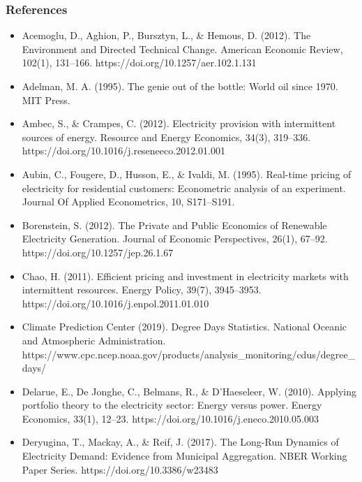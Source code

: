 \documentclass[aspectratio=169]{beamer}
\begin{document}
	
	
	\begin{frame}[allowframebreaks]
		\frametitle{References}
		\tiny 
		
		\begin{itemize}
			
			\item Acemoglu, D., Aghion, P., Bursztyn, L., \& Hemous, D. (2012). The Environment and Directed Technical Change. American Economic Review, 102(1), 131–166. https://doi.org/10.1257/aer.102.1.131
			
			\item Adelman, M. A. (1995). The genie out of the bottle: World oil since 1970. MIT Press.
			
			\item Ambec, S., \& Crampes, C. (2012). Electricity provision with intermittent sources of energy. Resource and Energy Economics, 34(3), 319–336. https://doi.org/10.1016/j.reseneeco.2012.01.001
			
			\item Aubin, C., Fougere, D., Husson, E., \& Ivaldi, M. (1995). Real-time pricing of electricity for residential customers: Econometric analysis of an experiment. Journal Of Applied Econometrics, 10, S171–S191.
			
			\item Borenstein, S. (2012). The Private and Public Economics of Renewable Electricity Generation. Journal of Economic Perspectives, 26(1), 67–92. https://doi.org/10.1257/jep.26.1.67
			
			\item Chao, H. (2011). Efficient pricing and investment in electricity markets with intermittent resources. Energy Policy, 39(7), 3945–3953. https://doi.org/10.1016/j.enpol.2011.01.010
			
			\item Climate Prediction Center (2019). Degree Days Statistics. National Oceanic and Atmospheric Administration. https://www.cpc.ncep.noaa.gov/products/analysis\_monitoring/cdus/degree\_days/
			
			\item Delarue, E., De Jonghe, C., Belmans, R., \& D’Haeseleer, W. (2010). Applying portfolio theory to the electricity sector: Energy versus power. Energy Economics, 33(1), 12–23. https://doi.org/10.1016/j.eneco.2010.05.003
			
			\item Deryugina, T., Mackay, A., \& Reif, J. (2017). The Long-Run Dynamics of Electricity Demand: Evidence from Municipal Aggregation. NBER Working Paper Series. https://doi.org/10.3386/w23483
			

\end{itemize}
\end{frame}
\end{document}
